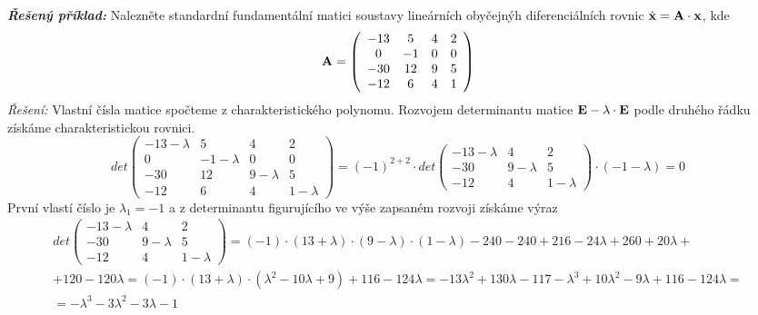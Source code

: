 {\it\bf Řešený příklad:}\newline %
Nalezněte standardní fundamentální matici soustavy lineárních obyčejnýh diferenciálních rovnic $\dot{\bf x}={\bf A}\cdot {\bf x}$, kde
\begin{equation*}
 {\bf A} = \left(\begin{array}{cccc}
                 -13 & 5 & 4 & 2\\ 0 & -1 & 0 & 0\\ -30 & 12 & 9 & 5\\ -12 & 6 & 4 & 1
                 \end{array}\right)
\end{equation*}
{\it Řešení:}\newline
Vlastní čísla matice spočteme z charakteristického polynomu. Rozvojem determinantu matice ${\bf E} - \lambda \cdot{\bf E}$ podle druhého řádku získáme charakteristickou rovnici.
\begin{equation*}
 det\left(\begin{array}{cccc}
                  -13 - \lambda & 5 & 4 & 2\\  
                   0 & -1 - \lambda & 0 & 0\\
                  -30 & 12 & 9 - \lambda & 5\\
                  -12 & 6 & 4 & 1 - \lambda
                 \end{array}\right)
  = (-1)^{2+2} \cdot det\left(\begin{array}{ccc}
                  -13 - \lambda  & 4 & 2\\
                  -30 & 9 - \lambda & 5\\
                  -12 & 4 & 1 - \lambda
                 \end{array}\right)\cdot (-1 -\lambda) = 0
\end{equation*}
První vlastí číslo je $\lambda_1 = -1$ a z determinantu figurujícího ve výše zapsaném rozvoji získáme výraz
\begin{equation*}
  \begin{array}{l}
	det\left(\begin{array}{ccc}
        -13 - \lambda  & 4 & 2\\
        -30 & 9 - \lambda & 5\\
        -12 & 4 & 1 - \lambda
        \end{array}\right) = 
	(-1)\cdot(13+\lambda)\cdot(9-\lambda)\cdot(1-\lambda) - 240 - 240 + 216 -24\lambda + 260 + 20\lambda +\\+ 120 - 120\lambda = 
	(-1)\cdot(13+\lambda)\cdot(\lambda^2 - 10\lambda + 9) + 116 - 124\lambda = -13\lambda^2 + 130\lambda - 117 - \lambda^3 + 10\lambda^2 - 9\lambda + 116 - 124\lambda =\\= -\lambda^3 - 3\lambda^2 - 3\lambda -1
  \end{array}
\end{equation*}
